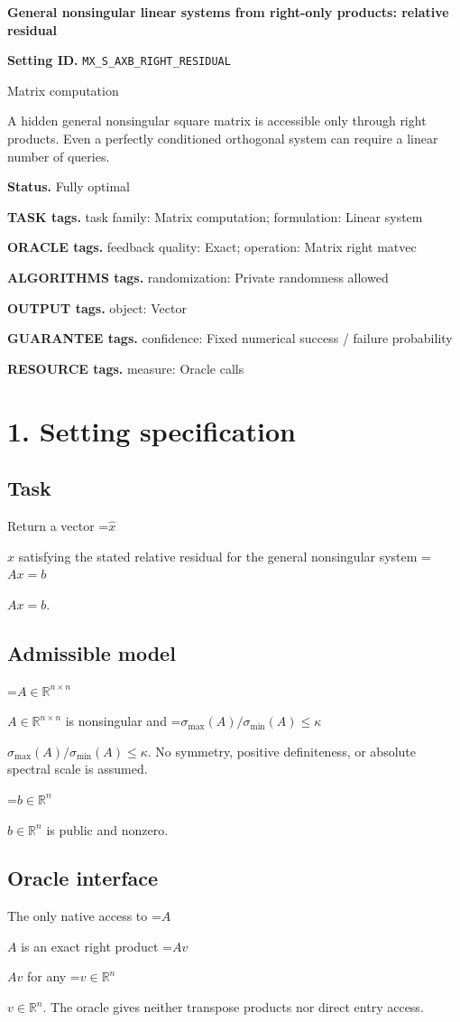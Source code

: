 \documentclass[10pt,a4paper]{article}
\newcommand{\AtlasMath}[1]{\par\begingroup\centering\setbox0=\hbox{$\displaystyle #1$}\ifdim\wd0>1.4\linewidth\typeout{ATLAS WIDE FORMULA: \the\wd0}\fi\ifdim\wd0>\linewidth\resizebox{\linewidth}{!}{\box0}\else\box0\fi\par\endgroup}
\newcommand{\AtlasInlineMath}[1]{\begingroup\setbox0=\hbox{$#1$}\ifdim\wd0>.4\linewidth\endgroup\AtlasMath{#1}\else\endgroup$#1$\fi}
\begin{document}
\raggedright

{\LARGE\bfseries\sffamily\color{AtlasNavy} General nonsingular linear systems from right-only products: relative residual\par}\vspace{5pt}
\textbf{Setting ID.} \texttt{MX\_\allowbreak{}S\_\allowbreak{}AXB\_\allowbreak{}RIGHT\_\allowbreak{}RESIDUAL}

Matrix computation

A hidden general nonsingular square matrix is accessible only through right products. Even a perfectly conditioned orthogonal system can require a linear number of queries.

\textbf{Status.} Fully optimal

\textbf{TASK tags.} task family: Matrix computation; formulation: Linear system

\textbf{ORACLE tags.} feedback quality: Exact; operation: Matrix right matvec

\textbf{ALGORITHMS tags.} randomization: Private randomness allowed

\textbf{OUTPUT tags.} object: Vector

\textbf{GUARANTEE tags.} confidence: Fixed numerical success / failure probability

\textbf{RESOURCE tags.} measure: Oracle calls

\section{1. Setting specification}
\subsection{Task}
Return a vector \AtlasInlineMath{\widehat x} satisfying the stated relative residual for the general nonsingular system \AtlasInlineMath{Ax=b}.

\subsection{Admissible model}
\AtlasInlineMath{A\in\mathbb R^{n\times n}} is nonsingular and \AtlasInlineMath{\sigma_{\max}(A)/\sigma_{\min}(A)\le\kappa}. No symmetry, positive definiteness, or absolute spectral scale is assumed.

\AtlasInlineMath{b\in\mathbb R^n} is public and nonzero.

\subsection{Oracle interface}
The only native access to \AtlasInlineMath{A} is an exact right product \AtlasInlineMath{Av} for any \AtlasInlineMath{v\in\mathbb R^n}. The oracle gives neither transpose products nor direct entry access.
\end{document}
